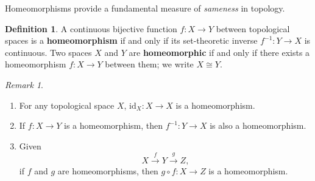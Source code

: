 \documentclass[ 12pt ]{article}
\theoremstyle{plain}
\theoremstyle{plain}
\theoremstyle{definition}
\newtheorem{definition}[theorem]{Definition}
\theoremstyle{remark}
\newtheorem{remark}[theorem]{Remark}
\begin{document}
Homeomorphisms provide a fundamental measure of \textit{sameness} in topology.

\begin{definition}
	A continuous bijective function $f : X \to Y$ between topological spaces is a \textbf{homeomorphism} if and only if its set-theoretic inverse $f^{-1} : Y \to X$ is continuous. Two
	spaces $X$ and $Y$ are \textbf{homeomorphic} if and only if there exists a homeomorphism $f : X \to Y$ between them; we write $X \cong Y$.
\end{definition}

\begin{remark} $ $
	\begin{enumerate}
		\item For any topological space $X$, $\mathrm{id}_X : X \to X$ is a homeomorphism.
		\item If $f : X \to Y$ is a homeomorphism, then $f^{-1} : Y \to X$ is also a homeomorphism.
		\item Given $$X \overset{f}{\rightarrow} Y \overset{g}{\rightarrow} Z,$$ if $f$ and $g$ are homeomorphisms, then $g \circ f : X \to Z$ is a homeomorphism.
	\end{enumerate}
\end{remark}
\end{document}
